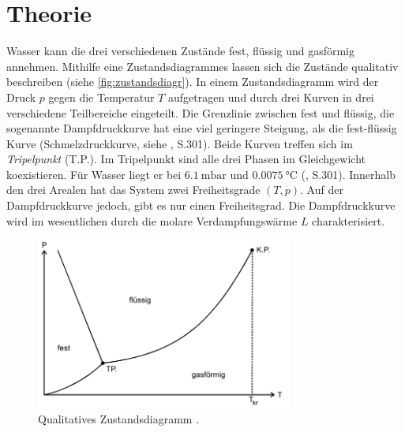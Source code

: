\section{Theorie}
\label{sec:Theorie}
Wasser kann die drei verschiedenen Zustände fest, flüssig und gasförmig annehmen. Mithilfe eine Zustandsdiagrammes lassen sich die 
Zustände qualitativ beschreiben (siehe \autoref{fig:zustandsdiagr}). In einem Zustandsdiagramm wird der Druck $p$ gegen die Temperatur $T$ 
aufgetragen und durch drei Kurven in drei verschiedene Teilbereiche eingeteilt. Die Grenzlinie zwischen fest und flüssig, die sogenannte 
Dampfdruckkurve hat eine viel geringere Steigung, als die fest-flüssig Kurve (Schmelzdruckkurve, siehe \cite{gerthsen}, S.301). Beide Kurven
treffen sich im \textit{Tripelpunkt} (T.P.). Im Tripelpunkt sind alle drei Phasen im Gleichgewicht koexistieren. Für Wasser liegt er bei 
$\SI{6.1}{\milli\bar}$ und $\SI{0.0075}{\celsius}$ (\cite{gerthsen}, S.301).
Innerhalb den drei Arealen hat das System zwei Freiheitsgrade $(T,p)$. 
Auf der Dampfdruckkurve jedoch, gibt es nur einen Freiheitsgrad.
Die Dampfdruckkurve wird im wesentlichen durch die molare Verdampfungswärme $L$ charakterisiert.

\begin{figure}[H]
    \centering
    \includegraphics[width=0.75\textwidth]{daten/Zustandsdiagramm.png}
    \caption{Qualitatives Zustandsdiagramm \cite{anleitung}.}
    \label{fig:zustandsdiagr}
\end{figure}


